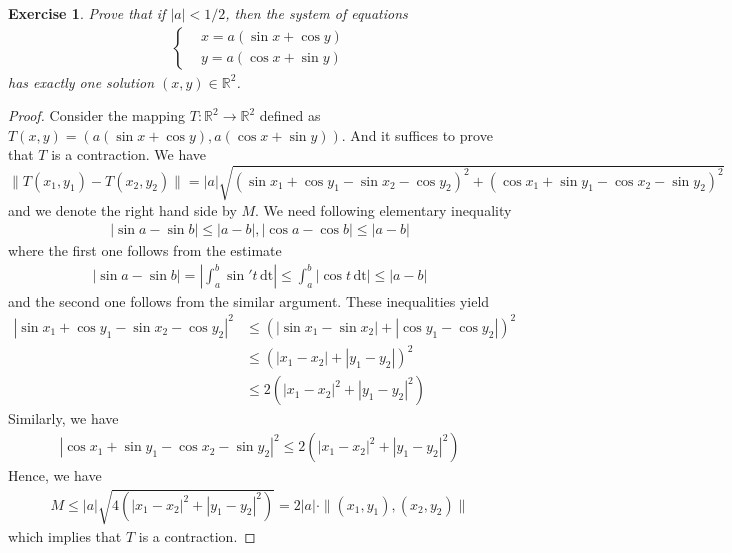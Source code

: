 \documentclass[12pt,leqno]{amsart}
\newtheorem{exercise}{Exercise}[section]
\theoremstyle{definition}
\numberwithin{equation}{subsection}
\begin{document}
\begin{exercise}
Prove that if $\left|a\right| < 1/2$, then the system of equations
\begin{align*}
    \left\{
    \begin{aligned}
        & x = a(\sin x + \cos y)\\
        & y = a(\cos x + \sin y)
    \end{aligned}
    \right.
\end{align*}
has exactly one solution $(x,y)\in \mathbb{R}^2$.
\end{exercise}
\begin{proof}
Consider the mapping $T:\mathbb{R}^2\to\mathbb{R}^2$ defined as $T(x,y) = \left(a(\sin x + \cos y), a(\cos x + \sin y)\right)$. And it suffices to prove that $T$ is a contraction. We have
\begin{dmath}
    \|T(x_1,y_1) - T(x_2,y_2)\| = |a|\sqrt{(\sin x_1 + \cos y_1 - \sin x_2 - \cos y_2)^2 
    + (\cos x_1 + \sin y_1 - \cos x_2 - \sin y_2)^2}
\end{dmath}
and we denote the right hand side by $M$. We need following elementary inequality 
\begin{align*}
    \left|\sin a - \sin b\right| \leq \left|a - b\right|, \left|\cos a - \cos b\right| \leq \left|a - b\right|
\end{align*}
where the first one follows from the estimate 
\begin{align*}
    \left|\sin a - \sin b\right| = \left|\int^b_a \sin' t \,\text{dt} \right| \leq \int^b_a \left|\cos t \,\text{dt}\right| \leq \left|a - b\right|
\end{align*}
and the second one follows from the similar argument. These inequalities yield 
\begin{align*}
    \left|\sin x_1 + \cos y_1 - \sin x_2 - \cos y_2\right|^2 &\leq \left(\left|\sin x_1 - \sin x_2\right| + \left|\cos y_1 - \cos y_2\right|\right)^2 \\
    &\leq \left(\left|x_1 - x_2\right| + \left|y_1 - y_2\right|\right)^2 \\
    &\leq 2 \left(\left|x_1 - x_2\right|^2 + \left|y_1 - y_2\right|^2 \right)
\end{align*}
Similarly, we have 
\begin{align*}
    \left|\cos x_1 + \sin y_1 - \cos x_2 - \sin y_2\right|^2 \leq 2 \left(\left|x_1 - x_2\right|^2 + \left|y_1 - y_2\right|^2 \right)
\end{align*}
Hence, we have 
\begin{align*}
    M \leq |a| \sqrt{4 \left(\left|x_1 - x_2\right|^2 + \left|y_1 - y_2\right|^2 \right)} = 2|a| \cdot \|(x_1,y_1),(x_2,y_2)\|
\end{align*}
which implies that $T$ is a contraction.
\end{proof}
\end{document}
